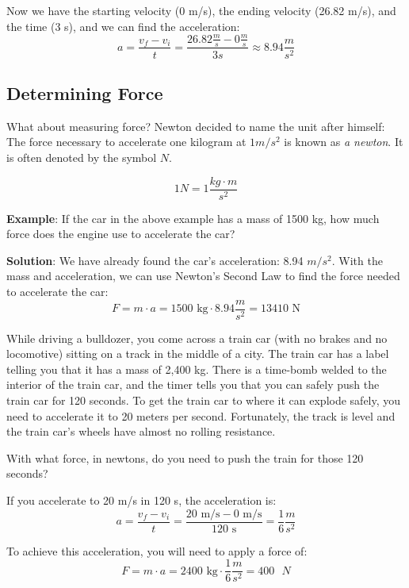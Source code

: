 Now we have the starting velocity (0 m/s), the ending velocity (26.82 m/s), and 
the time (3 s), and we can find the acceleration:
$$a = \frac{v_f - v_i}{t} = \frac{26.82\frac{m}{s} - 0\frac{m}{s}}{3s} \approx 
8.94 \frac{m}{s^2}$$

\subsection{Determining Force}
What about measuring force? Newton decided to name the unit after himself: The
force necessary to accelerate one kilogram at $1 m/s^2$ is known as \textit{a
newton}. It is often denoted by the symbol $N$.

$$1 N = 1 \frac{kg \cdot m}{s^2}$$

\textbf{Example}: If the car in the above example has a mass of 1500 kg, how much 
force does the engine use to accelerate the car?

\textbf{Solution}: We have already found the car's acceleration: 8.94 $m/s^2$. 
With the mass and acceleration, we can use Newton's Second Law to find the force 
needed to accelerate the car:
$$F = m \cdot a = 1500\text{ kg} \cdot 8.94 \frac{m}{s^2} = 13410\text{ N}$$

\begin{Exercise}[title={Acceleration}, label=acceleration_train]

While driving a bulldozer, you come across a train car (with no brakes
and no locomotive) sitting on a track in the middle of a city. The train car
has a label telling you that it has a mass of 2,400 kg. There is a time-bomb
welded to the interior of the train car, and the timer tells you that
you can safely push the train car for 120 seconds. To get the train
car to where it can explode safely, you need to accelerate it to 20 meters per
second. Fortunately, the track is level and the train car's wheels have
almost no rolling resistance.

With what force, in newtons, do you need to push the train for those 120 seconds?

\end{Exercise}
\begin{Answer}[ref=acceleration_train]
If you accelerate to 20 m/s in 120 s, the acceleration is:
$$a = \frac{v_f - v_i}{t} = \frac{20\text{ m/s} - 0\text{ m/s}}{120\text{ s}} = 
\frac{1}{6} \frac{m}{s^2}$$

To achieve this acceleration, you will need to apply a force of:
$$F = m \cdot a = 2400\text{ kg} \cdot \frac{1}{6} \frac{m}{s^2} = 400\text{ }N$$
\end{Answer}



